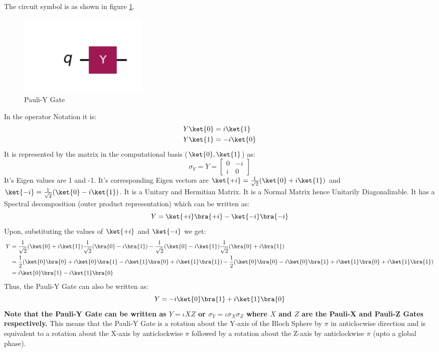 \documentclass[12pt, oneside]{book}
\theoremstyle{definition}
\theoremstyle{definition}
\theoremstyle{remark}
\begin{document}
The circuit symbol is as shown in figure \ref{fig:pauli-y}.
\begin{figure}[H]
    \centering
    \includegraphics[width=0.3\textwidth]{../images/pauli-y.png}
    \caption{Pauli-Y Gate}
    \label{fig:pauli-y}
\end{figure}
In the operator Notation it is:
\begin{align*}
    Y\ket{0}&=i\ket{1} \\
    Y\ket{1}&=-i\ket{0}
\end{align*}
It is represented by the matrix in the computational basis ($\ket{0},\ket{1}$) as:
\[
    \sigma_Y=Y=\begin{bmatrix}
        0 & -i \\
        i & 0
    \end{bmatrix}
\]
It's Eigen values are 1 and -1. It's corresponding Eigen vectors are $\ket{+i}=\frac{1}{\sqrt{2}}(\ket{0}+i\ket{1})$ and $\ket{-i}=\frac{1}{\sqrt{2}}(\ket{0}-i\ket{1})$.
It is a Unitary and Hermitian Matrix. It is a Normal Matrix hence Unitarily Diagonalizable.
It has a Spectral decomposition (outer product representation) which can be written as:
\[
    Y=\ket{+i}\bra{+i}-\ket{-i}\bra{-i}
\]
Upon, substituting the values of $\ket{+i}$ and $\ket{-i}$ we get:
\begin{align*}
    Y&=\dfrac{1}{\sqrt{2}}(\ket{0}+i\ket{1})\dfrac{1}{\sqrt{2}}(\bra{0}-i\bra{1})-\dfrac{1}{\sqrt{2}}(\ket{0}-i\ket{1})\dfrac{1}{\sqrt{2}}(\bra{0}+i\bra{1})\\
    &=\dfrac{1}{2}(\ket{0}\bra{0}+i\ket{0}\bra{1}-i\ket{1}\bra{0}+i\ket{1}\bra{1})-\dfrac{1}{2}(\ket{0}\bra{0}-i\ket{0}\bra{1}+i\ket{1}\bra{0}+i\ket{1}\bra{1})\\
    &=i\ket{0}\bra{1}-i\ket{1}\bra{0}
\end{align*}
Thus, the Pauli-Y Gate can also be written as:
\[
    Y=-i\ket{0}\bra{1}+i\ket{1}\bra{0}
\]
\textbf{Note that the Pauli-Y Gate can be written as $Y=\iota XZ$ or $\sigma_Y=\iota \sigma_X\sigma_Z$  where $X$ and $Z$ are the Pauli-X and Pauli-Z Gates respectively.}
This means that the Pauli-Y Gate is a rotation about the Y-axis of the Bloch Sphere by $\pi$ in anticlocwise direction and is equivalent to a rotation about the X-axis by anticlockwise $\pi$ followed by a rotation about the Z-axis by anticlockwise $\pi$
(upto a global phase).
\end{document}
